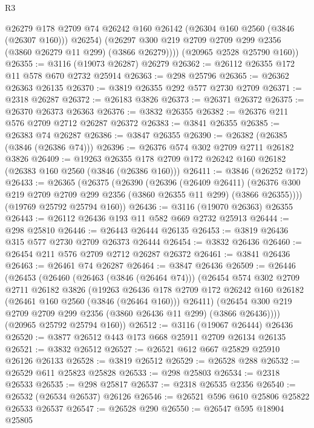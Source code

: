 \begin{lexlean}{R3}
\begin{coremodule}
            @26279
            @178
            @2709
            @74
            @26242
            @160
            @26142
            (@26304 @160 @2560 (@3846 (@26307 @160)))
            @26254)
          (@26297 @300 @219 @2709 @2709 @299 @2356 (@3860 @26279 @11 @299) (@3866 @26279))))
      (@20965 @2528 @25790 @160))
@26355 := @3116 (@19073 @26287) @26279
@26362 := @26112 @26355 @172 @11 @578 @670 @2732 @25914
@26363 := @298 @25796
@26365 := @26362 @26363 @26135
@26370 := @3819 @26355 @292 @577 @2730 @2709
@26371 := @2318 @26287
@26372 := @26183 @3826
@26373 := @26371 @26372
@26375 := @26370 @26373 @26363
@26376 := @3832 @26355
@26382 := @26376 @211 @576 @2709 @2712 @26287 @26372
@26383 := @3841 @26355
@26385 := @26383 @74 @26287
@26386 := @3847 @26355
@26390 := @26382 (@26385 (@3846 (@26386 @74)))
@26396 := @26376 @574 @302 @2709 @2711 @26182 @3826
@26409 := @19263 @26355 @178 @2709 @172 @26242 @160 @26182 (@26383 @160 @2560 (@3846 (@26386 @160)))
@26411 := @3846 (@26252 @172)
@26433 := @26365
    (@26375
      (@26390
        (@26396
          (@26409 @26411)
          (@26376 @300 @219 @2709 @2709 @299 @2356 (@3860 @26355 @11 @299) (@3866 @26355))))
      (@19769 @25792 @25794 @160))
@26436 := @3116 (@19070 @26363) @26355
@26443 := @26112 @26436 @193 @11 @582 @669 @2732 @25913
@26444 := @298 @25810
@26446 := @26443 @26444 @26135
@26453 := @3819 @26436 @315 @577 @2730 @2709 @26373 @26444
@26454 := @3832 @26436
@26460 := @26454 @211 @576 @2709 @2712 @26287 @26372
@26461 := @3841 @26436
@26463 := @26461 @74 @26287
@26464 := @3847 @26436
@26509 := @26446
    (@26453
      (@26460
        (@26463 (@3846 (@26464 @74)))
        (@26454
          @574
          @302
          @2709
          @2711
          @26182
          @3826
          (@19263
            @26436
            @178
            @2709
            @172
            @26242
            @160
            @26182
            (@26461 @160 @2560 (@3846 (@26464 @160)))
            @26411)
          (@26454 @300 @219 @2709 @2709 @299 @2356 (@3860 @26436 @11 @299) (@3866 @26436))))
      (@20965 @25792 @25794 @160))
@26512 := @3116 (@19067 @26444) @26436
@26520 := @3877 @26512 @443 @173 @668 @25911 @2709 @26134 @26135
@26521 := @3832 @26512
@26527 := @26521 @612 @667 @25829 @25910 @26126 @26133
@26528 := @3819 @26512
@26529 := @26528 @288
@26532 := @26529 @611 @25823 @25828
@26533 := @298 @25803
@26534 := @2318 @26533
@26535 := @298 @25817
@26537 := @2318 @26535 @2356
@26540 := @26532 (@26534 @26537) @26126
@26546 := @26521 @596 @610 @25806 @25822 @26533 @26537
@26547 := @26528 @290
@26550 := @26547 @595 @18904 @25805

\end{coremodule}
\end{lexlean}
